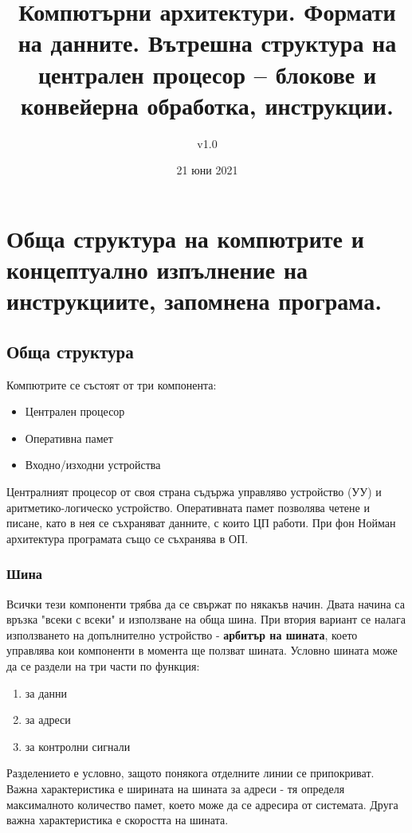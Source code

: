 \documentclass[fleqn,12pt]{article}
\title{Компютърни архитектури. Формати на данните. Вътрешна структура на централен процесор – блокове и конвейерна обработка, инструкции.}
\author{v1.0}
\date{21 юни 2021}
\begin{document}
\maketitle

\tableofcontents

\section{Обща структура на компютрите и концептуално изпълнение на инструкциите,
запомнена програма.}

\subsection{Обща структура}
Компютрите се състоят от три компонента:
\begin{itemize}
    \item Централен процесор
    \item Оперативна памет
    \item Входно/изходни устройства
\end{itemize}

Централният процесор от своя страна съдържа управляво устройство (УУ) и аритметико-логическо устройство. 
Оперативната памет позволява четене и писане, като в нея се съхраняват данните, с които ЦП работи.
При фон Нойман архитектура програмата също се съхранява в ОП.

\subsubsection{Шина}
Всички тези компоненти трябва да се свържат по някакъв начин. Двата начина са връзка "всеки с всеки" и използване 
на обща шина. При втория вариант се налага използването на допълнително устройство - \textbf{арбитър на шината}, 
което управлява кои компоненти в момента ще ползват шината. Условно шината може да се раздели на три части по функция:
\begin{enumerate}
    \item за данни
    \item за адреси
    \item за контролни сигнали
\end{enumerate}

Разделението е условно, защото понякога отделните линии се припокриват. Важна характеристика е ширината на шината за адреси - тя определя
максималното количество памет, което може да се адресира от системата. Друга важна характеристика е скоростта на шината.
\end{document}
